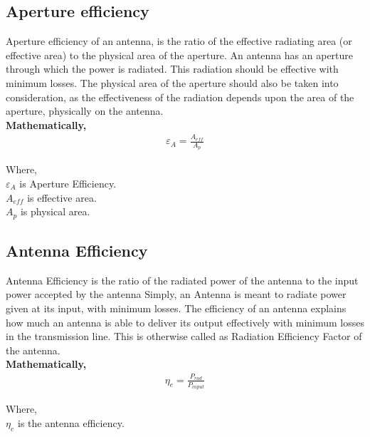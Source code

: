 \documentclass[a4paper,12pt]{article}
\begin{document}
\begin{A}
{        \subsection{Aperture efficiency}
        Aperture efficiency of an antenna, is the ratio of the effective radiating area (or effective area) to the physical area of the aperture.
        An antenna has an aperture through which the power is radiated. This radiation should be effective with minimum losses.
        The physical area of the aperture should also be taken into consideration,
        as the effectiveness of the radiation depends upon the area of the aperture, physically on the antenna.\\

        \textbf{Mathematically,}
        \begin{align*}
            \varepsilon_{A} = \frac{A_{eff}}{A_{p}}
        \end{align*}

        Where,\\

        \(\varepsilon_{A}\) is Aperture Efficiency.\\

        \({A_{eff}}\) is effective area.\\

        \({A_{p}}\)  is physical area.\\


        \subsection{Antenna Efficiency}
        Antenna Efficiency is the ratio of the radiated power of the antenna to the input power accepted by the antenna
        Simply, an Antenna is meant to radiate power given at its input, with minimum losses.
        The efficiency of an antenna explains how much an antenna is able to deliver
        its output effectively with minimum losses in the transmission line.
        This is otherwise called as Radiation Efficiency Factor of the antenna.\\

        \textbf{Mathematically,}
        \begin{align*}
            \eta_{e} = \frac{P_{rad}}{P_{input}}
        \end{align*}

        Where,\\

        \(\eta_{e}\) is the antenna efficiency.\\

}
\end{A}
\end{document}
